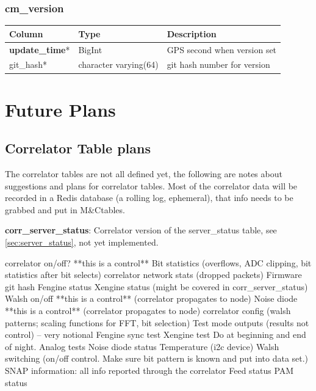 \documentclass{article}
\newcommand{\mc}{M\&C}
\begin{document}
{\subsubsection{cm\_version}
\begin{center}
\begin{tabular}{| p{4cm} | p{2cm} | p{10cm} |}
\hline
{\bf Column} & {\bf Type} & {\bf Description} \\ \hline
{\bf update\_time}* & BigInt & GPS second when version set \\ \hline
git\_hash* & character varying(64) & git hash number for version \\ \hline
\end{tabular}
\end{center}


\section{Future Plans}
\label{sec:future}
\subsection{Correlator Table plans}
\label{sec:corr_future}
The correlator tables are not all defined yet, the following are notes about suggestions and plans for correlator tables. Most of the correlator data will be recorded in a Redis database (a rolling log, ephemeral), that info needs to be grabbed and put in \mc tables.

\textbf{corr\_server\_status}: Correlator version of the server\_status table, see \ref{sec:server_status}, not yet implemented.

\begin{outline}[enumerate]
	\1 correlator on/off?	**this is a control**
	\1 Bit statistics (overflows, ADC clipping, bit statistics after bit selects)
	\1 correlator network stats (dropped packets)
	\1 Firmware git hash
	\1 Fengine status
	\1 Xengine status (might be covered in corr\_server\_status)
	\1 Walsh on/off	**this is a control** (correlator propagates to node)
	\1 Noise diode	**this is a control** (correlator propagates to node)
	\1 correlator config (walsh patterns; scaling functions for FFT, bit selection)
	\1 Test mode outputs (results not control) -- very notional
		\2 Fengine sync test
		\2 Xengine test
		\2 Do at beginning and end of night.
		\2 Analog tests
			\3 Noise diode status
			\3 Temperature (i2c device)
			\3 Walsh switching (on/off control. Make sure bit pattern is known and put into data set.)
	\1 SNAP information: all info reported through the correlator
		\2 Feed status
		\2 PAM status


\end{outline}}
\end{document}
